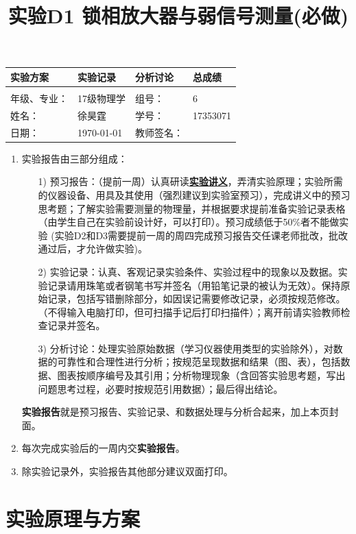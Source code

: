 \documentclass[11pt,a4paper]{ctexart}
\title{实验D1 锁相放大器与弱信号测量(必做)}
\begin{document}
\maketitle
\begin{tabular}{|p{8em}|p{8em}|p{8em}|p{5em}|}
\hline
		实验方案 &实验记录  &分析讨论 &总成绩\\
		\hline
		        &          &          &  \\
	    \hline
	\hline 
	年级、专业： &17级物理学 &组号：& 6 \\
	\hline
	姓名：& 徐昊霆 &学号：&17353071  \\
	\hline
	日期：& \today &教师签名： &  \\
    \hline	
        \end{tabular}

\begin{enumerate}
 \item 实验报告由三部分组成：
 \begin{enumerate}
  \item[1)]预习报告：（提前一周）认真研读\textbf{\uline{实验讲义}}，弄清实验原理；实验所需的仪器设备、用具及其使用（强烈建议到实验室预习），完成讲义中的预习思考题；了解实验需要测量的物理量，并根据要求提前准备实验记录表格（由学生自己在实验前设计好，可以打印）。预习成绩低于50\%者不能做实验{\color{red} (实验D2和D3需要提前一周的周四完成预习报告交任课老师批改，批改通过后，才允许做实验)}。

  \item[2)]实验记录：认真、客观记录实验条件、实验过程中的现象以及数据。实验记录请用珠笔或者钢笔书写并签名（{\color{red}用铅笔记录的被认为无效}）。{\color{red}保持原始记录，包括写错删除部分，如因误记需要修改记录，必须按规范修改。}（不得输入电脑打印，但可扫描手记后打印扫描件）；离开前请实验教师检查记录并签名。
  \item[3)]分析讨论：处理实验原始数据（学习仪器使用类型的实验除外），对数据的可靠性和合理性进行分析；按规范呈现数据和结果（图、表），包括数据、图表按顺序编号及其引用；分析物理现象（含回答实验思考题，写出问题思考过程，必要时按规范引用数据）；最后得出结论。
 \end{enumerate}
 \textbf{实验报告}就是预习报告、实验记录、和数据处理与分析合起来，加上本页封面。
 \item 每次完成实验后的一周内交\textbf{实验报告}。
 \item 除实验记录外，实验报告其他部分建议双面打印。
\end{enumerate}
\newpage
\tableofcontents
\newpage
\section{实验原理与方案}
\end{document}
